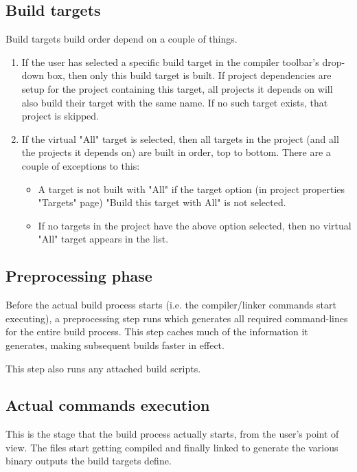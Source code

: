 \subsection{Build targets}

Build targets build order depend on a couple of things.

\begin{enumerate}
\item If the user has selected a specific build target in the compiler toolbar's drop-down box, then only this build target is built. If project dependencies are setup for the project containing this target, all projects it depends on will also build their target with the same name. If no such target exists, that project is skipped.
\item If the virtual "All" target is selected, then all targets in the project (and all the projects it depends on) are built in order, top to bottom. There are a couple of exceptions to this:
    \begin{itemize}
    \item A target is not built with "All" if the target option (in project properties "Targets" page) "Build this target with All" is not selected.
    \item If no targets in the project have the above option selected, then no virtual "All" target appears in the list.
    \end{itemize}
\end{enumerate}

\subsection{Preprocessing phase}

Before the actual build process starts (i.e. the compiler/linker commands start executing), a preprocessing step runs which generates all required command-lines for the entire build process. This step caches much of the information it generates, making subsequent builds faster in effect.

This step also runs any attached build scripts.


\subsection{Actual commands execution}

This is the stage that the build process actually starts, from the user's point of view. The files start getting compiled and finally linked to generate the various binary outputs the build targets define.

